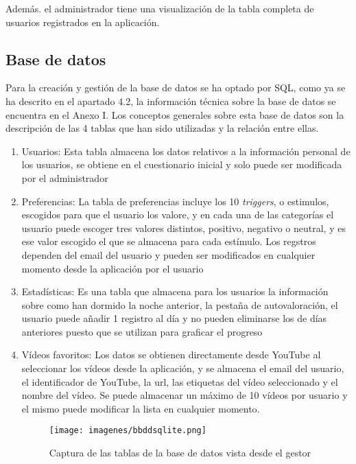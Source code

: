 \documentclass[a4paper,12pt,twoside]{memoir}
\begin{document}
Además. el administrador tiene una visualización de la tabla completa de usuarios registrados en la aplicación.
\subsection{Base de datos}
Para la creación y gestión de la base de datos se ha optado por SQL, como ya se ha descrito en el apartado 4.2, la información técnica sobre la base de datos se encuentra en el Anexo I. Los conceptos generales sobre esta base de datos son la descripción de las 4 tablas que han sido utilizadas y la relación entre ellas.
\begin{enumerate}
    \item Usuarios: Esta tabla almacena los datos relativos a la información personal de los usuarios, se obtiene en el cuestionario inicial y solo puede ser modificada por el administrador
    \item Preferencias: La tabla de preferencias incluye los 10 \textit{triggers}, o estimulos, escogidos para que el usuario los valore, y en cada una de las categorías el usuario puede escoger tres valores distintos, positivo, negativo o neutral, y es ese valor escogido el que se almacena para cada estímulo. Los regstros dependen del email del usuario y pueden ser modificados en cualquier momento desde la aplicación por el usuario
    \item Estadísticas: Es una tabla que almacena para los usuarios la información sobre como han dormido la noche anterior, la pestaña de autovaloración, el usuario puede añadir 1 registro al día y no pueden eliminarse los de días anteriores puesto que se utilizan para graficar el progreso
    \item Vídeos favoritos: Los datos se obtienen directamente desde YouTube al seleccionar los vídeos desde la aplicación, y se almacena el email del usuario, el identificador de YouTube, la url, las etiquetas del vídeo seleccionado y el nombre del vídeo. Se puede almacenar un máximo de 10 vídeos por usuario y el mismo puede modificar la lista en cualquier momento.
    \begin{figure}
        \centering
        \texttt{[image: imagenes/bbddsqlite.png]}
        \caption{Captura de las tablas de la base de datos vista desde el gestor}
        \label{fig:enter-label}
    \end{figure}
\end{enumerate}
\end{document}

